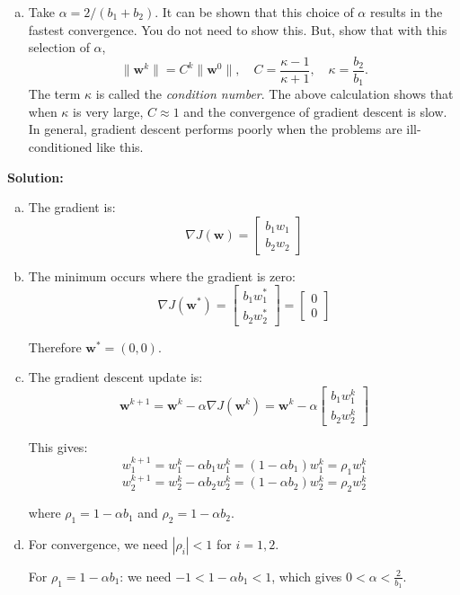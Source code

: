 \documentclass[11pt]{article}
\newcommand{\wbf}{\mathbf{w}}
\begin{document}
\begin{enumerate}
\begin{enumerate}[(a)]
\item Take $\alpha = 2/(b_1+b_2)$.  It can be shown that this choice of $\alpha$ results in the fastest convergence.  You do not need to show this.
But, show that with this selection of $\alpha$,
\[
    \|\wbf^k\| = C^k \|\wbf^0\|, \quad C = \frac{\kappa-1}{\kappa+1 }, \quad
    \kappa = \frac{b_2}{b_1}.
\]
The term $\kappa$ is called the \emph{condition number}.  The above calculation
shows that when $\kappa$ is very large, $C \approx 1$ and the convergence
of gradient descent is slow.  In general, gradient descent performs poorly
when the problems are ill-conditioned like this.
\end{enumerate}

\textbf{Solution:}
\begin{enumerate}[(a)]
\item The gradient is:
$$\nabla J(\wbf) = \begin{bmatrix} b_1 w_1 \\ b_2 w_2 \end{bmatrix}$$

\item The minimum occurs where the gradient is zero:
$$\nabla J(\wbf^*) = \begin{bmatrix} b_1 w_1^* \\ b_2 w_2^* \end{bmatrix} = \begin{bmatrix} 0 \\ 0 \end{bmatrix}$$

Therefore $\wbf^* = (0, 0)$.

\item The gradient descent update is:
$$\wbf^{k+1} = \wbf^k - \alpha \nabla J(\wbf^k) = \wbf^k - \alpha \begin{bmatrix} b_1 w_1^k \\ b_2 w_2^k \end{bmatrix}$$

This gives:
$$w_1^{k+1} = w_1^k - \alpha b_1 w_1^k = (1 - \alpha b_1) w_1^k = \rho_1 w_1^k$$
$$w_2^{k+1} = w_2^k - \alpha b_2 w_2^k = (1 - \alpha b_2) w_2^k = \rho_2 w_2^k$$

where $\rho_1 = 1 - \alpha b_1$ and $\rho_2 = 1 - \alpha b_2$.

\item For convergence, we need $|\rho_i| < 1$ for $i = 1,2$.

For $\rho_1 = 1 - \alpha b_1$: we need $-1 < 1 - \alpha b_1 < 1$, which gives $0 < \alpha < \frac{2}{b_1}$.


\end{enumerate}
\end{enumerate}
\end{document}
